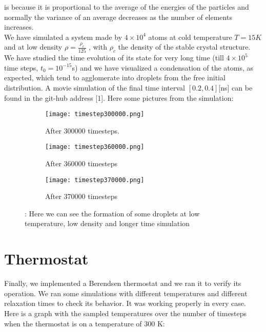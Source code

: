 \documentclass[10pt,a4paper,titlepage]{article}
\begin{document}
is because it is proportional to the average of the energies of the particles and normally the variance of an average
decreases as the number of elements increases.\\
We have simulated a system made by $4 \times 10^4$
atoms at cold temperature $T = 15K$ and at low density $\rho =
\frac{\rho_c}{125}$ , with
$\rho_c$ the density of the stable crystal structure. We have studied the time evolution of its state for very long time (till
$4 \times 10^5$
time steps, $t_0 = 10^{−15}$s) and we have visualized a condensation of the atoms, as expected, which tend to
agglomerate into droplets from the free initial distribution. A movie simulation of the final time interval $[0.2, 0.4]$[ns]
can be found in the git-hub address [1]. Here some pictures from the simulation:
\begin{center}
\begin{figure}[H]
 \centering
\begin{subfigure}{.34\textwidth}
  \centering
  \texttt{[image: timestep300000.png]}
  \caption{After 300000 timesteps.}
  \label{fig:sfiga2}
\end{subfigure}%
\begin{subfigure}{.31\textwidth}
  \centering
  \texttt{[image: timestep360000.png]}
  \caption{After 360000 timesteps}
  \label{fig:sfiga2}
\end{subfigure}%
\begin{subfigure}{.33\textwidth}
  \centering
  \texttt{[image: timestep370000.png]}
  \caption{After 370000 timesteps}
  \label{fig:sfiga2}
\end{subfigure}%
\caption{{\footnotesize : Here we can see the formation of some droplets at low temperature, low density and longer time simulation
}}
\label{fig:fig}
\end{figure}
\end{center} 


\section*{Thermostat}
\noindent Finally, we implemented a Berendsen thermostat and we ran it to verify its operation. We ran some simulations
with different temperatures and different relaxation times to check its behavior. It was working properly in every
case. Here is a graph with the sampled temperatures over the number of timesteps when the thermostat is on a
temperature of 300 K:
\end{document}
